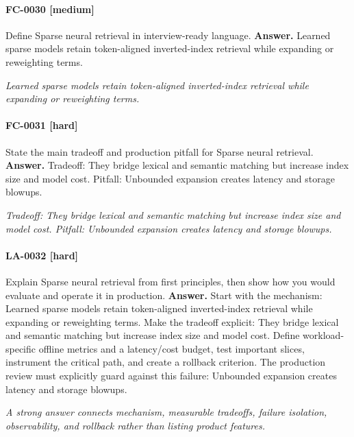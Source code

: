 \paragraph{FC-0030 [medium]} Define Sparse neural retrieval in interview-ready language.
\noindent\textbf{Answer.} Learned sparse models retain token-aligned inverted-index retrieval while expanding or reweighting terms.
\par\textit{Learned sparse models retain token-aligned inverted-index retrieval while expanding or reweighting terms.}
\paragraph{FC-0031 [hard]} State the main tradeoff and production pitfall for Sparse neural retrieval.
\noindent\textbf{Answer.} Tradeoff: They bridge lexical and semantic matching but increase index size and model cost. Pitfall: Unbounded expansion creates latency and storage blowups.
\par\textit{Tradeoff: They bridge lexical and semantic matching but increase index size and model cost. Pitfall: Unbounded expansion creates latency and storage blowups.}
\paragraph{LA-0032 [hard]} Explain Sparse neural retrieval from first principles, then show how you would evaluate and operate it in production.
\noindent\textbf{Answer.} Start with the mechanism: Learned sparse models retain token-aligned inverted-index retrieval while expanding or reweighting terms. Make the tradeoff explicit: They bridge lexical and semantic matching but increase index size and model cost. Define workload-specific offline metrics and a latency/cost budget, test important slices, instrument the critical path, and create a rollback criterion. The production review must explicitly guard against this failure: Unbounded expansion creates latency and storage blowups.
\par\textit{A strong answer connects mechanism, measurable tradeoffs, failure isolation, observability, and rollback rather than listing product features.}
